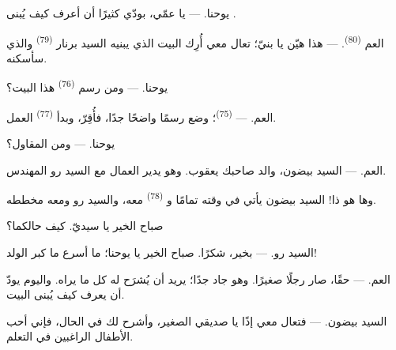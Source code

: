 %
%

\VUsaut{6.0mm}
\VUsaut{1.4mm}
\VUsaut{2.2mm}

\VUsaut{3.0mm}

\textsc{يوحنا}. --- يا عمّي، بودّي كثيرًا أن أعرف كيف يُبنى .

\textsc{العم} \textsuperscript{(80)}. --- هذا هيّن يا بنيّ؛ تعال معي أُرِك
البيت الذي يبنيه السيد برنار \textsuperscript{(79)} والذي سأسكنه.

\textsc{يوحنا}. --- ومن رسم  \textsuperscript{(76)} هذا البيت؟

\textsc{العم}. ---  \textsuperscript{(75)}؛ وضع رسمًا
واضحًا جدًا، فأُقِرّ، وبدأ  \textsuperscript{(77)} العمل.

\textsc{يوحنا}. --- ومن المقاول؟

\textsc{العم}. --- السيد بيضون، والد صاحبك يعقوب. وهو يدير العمال مع
السيد رو المهندس.

وها هو ذا! السيد بيضون يأتي في وقته تمامًا و
\textsuperscript{(78)} معه، والسيد رو ومعه مخططه.

صباح الخير يا سيديّ. كيف حالكما؟

\textsc{السيد رو}. --- بخير، شكرًا. صباح الخير يا يوحنا؛ ما أسرع ما كبر
الولد!

\textsc{العم}. --- حقًا، صار رجلًا صغيرًا. وهو جاد جدًا؛ يريد أن يُشرَح له
كل ما يراه. واليوم يودّ أن يعرف كيف يُبنى البيت.

\VUsaut{3.0mm}

\textsc{السيد بيضون}. --- فتعال معي إذًا يا صديقي الصغير، وأشرح لك في
الحال، فإني أحب الأطفال الراغبين في التعلم.

